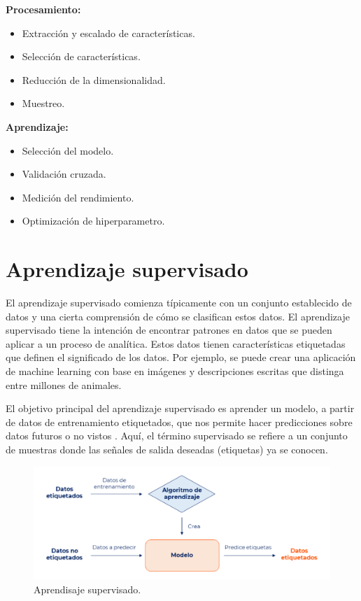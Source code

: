 \textbf{Procesamiento:}
  \begin{itemize}
    \item Extracción y escalado de características.
    \item Selección de características.
    \item Reducción de la dimensionalidad.
    \item Muestreo.
  \end{itemize}
\textbf{Aprendizaje:}%
  \begin{itemize}
    \item Selección del modelo.
    \item Validación cruzada.
    \item Medición del rendimiento.
    \item Optimización de hiperparametro.
  \end{itemize}

\section{Aprendizaje supervisado}

El aprendizaje supervisado comienza típicamente con un conjunto establecido de datos y una cierta comprensión de cómo se clasifican estos datos. El aprendizaje supervisado tiene la intención de encontrar patrones en datos que se pueden aplicar a un proceso de analítica. Estos datos tienen características etiquetadas que definen el significado de los datos. Por ejemplo, se puede crear una aplicación de machine learning con base en imágenes y descripciones escritas que distinga entre millones de animales\cite{ibm}.

\vspace{1\baselineskip}
El objetivo principal del aprendizaje supervisado es aprender un modelo, a partir de datos de entrenamiento etiquetados, que nos permite hacer predicciones sobre datos futuros o no vistos \cite{mirjalili2020python}. Aquí, el término supervisado se refiere a un conjunto de muestras donde las señales
de salida deseadas (etiquetas) ya se conocen.

\begin{figure}[H]
  \begin{center}
    \includegraphics[scale=0.70]{./aprendisaje_supervisado.png}
    \caption{Aprendisaje supervisado\cite{decide}.}
    \label{fig:aprendisajesupervisado}
  \end{center}
\end{figure}

